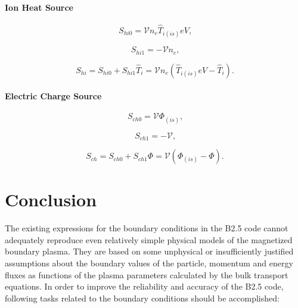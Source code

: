 \documentclass[11pt]{article}
\begin{document}
\paragraph{Ion Heat Source}

\bigskip

\begin{equation}
S_{hi0}=\mathcal{V}n_{e}\widehat{T}_{i\left( is\right) }eV\text{,} 
\label{c357}
\end{equation}

\begin{equation}
S_{hi1}=-\mathcal{V}n_{e}\text{,}   \label{c358}
\end{equation}

\begin{equation}
S_{hi}=S_{hi0}+S_{hi1}\widehat{T}_{i}=\mathcal{V}n_{e}\left( \widehat
{T}_{i\left( is\right) }eV-\widehat{T}_{i}\right) \text{.}   \label{c359}
\end{equation}

\bigskip

\paragraph{Electric Charge Source}

\bigskip

\begin{equation}
S_{ch0}=\mathcal{V}\Phi_{\left( is\right) }\text{,}   \label{c360}
\end{equation}

\begin{equation}
S_{ch1}=-\mathcal{V}\text{,}   \label{c361}
\end{equation}

\begin{equation}
S_{ch}=S_{ch0}+S_{ch1}\Phi=\mathcal{V}\left( \Phi_{\left( is\right)
}-\Phi\right) \text{.}   \label{c362}
\end{equation}

\bigskip

\bigskip

\section{Conclusion}

\bigskip

The existing expressions for the boundary conditions in the B2.5 code cannot
adequately reproduce even relatively simple physical models of the
magnetized boundary plasma. They are based on some unphysical or
insufficiently justified assumptions about the boundary values of the
particle, momentum and energy fluxes as functions of the plasma parameters
calculated by the bulk transport equations. In order to improve the
reliability and accuracy of the B2.5 code, following tasks related to the
boundary conditions should be accomplished:
\end{document}
